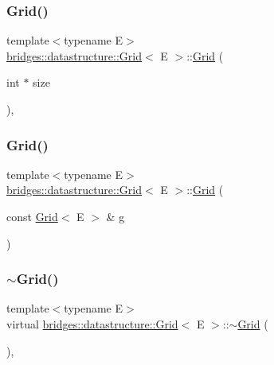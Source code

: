 \subsubsection{\texorpdfstring{Grid()}{Grid()}\hspace{0.1cm}{\footnotesize\ttfamily [3/4]}}
{\footnotesize\ttfamily template$<$typename E$>$ \\
\mbox{\hyperlink{classbridges_1_1datastructure_1_1_grid}{bridges\+::datastructure\+::\+Grid}}$<$ E $>$\+::\mbox{\hyperlink{classbridges_1_1datastructure_1_1_grid}{Grid}} (\begin{DoxyParamCaption}\item[{int $\ast$}]{size }\end{DoxyParamCaption})\hspace{0.3cm}{\ttfamily [inline]}, {\ttfamily [explicit]}}

\mbox{\label{classbridges_1_1datastructure_1_1_grid_afc81003993a30d1112d2dff71bfc191b}} 
\subsubsection{\texorpdfstring{Grid()}{Grid()}\hspace{0.1cm}{\footnotesize\ttfamily [4/4]}}
{\footnotesize\ttfamily template$<$typename E$>$ \\
\mbox{\hyperlink{classbridges_1_1datastructure_1_1_grid}{bridges\+::datastructure\+::\+Grid}}$<$ E $>$\+::\mbox{\hyperlink{classbridges_1_1datastructure_1_1_grid}{Grid}} (\begin{DoxyParamCaption}\item[{const \mbox{\hyperlink{classbridges_1_1datastructure_1_1_grid}{Grid}}$<$ E $>$ \&}]{g }\end{DoxyParamCaption})\hspace{0.3cm}{\ttfamily [inline]}}

\mbox{\label{classbridges_1_1datastructure_1_1_grid_aa04b4929a35fa359dbaab86e46fda204}} 
\subsubsection{\texorpdfstring{$\sim$\+Grid()}{~Grid()}}
{\footnotesize\ttfamily template$<$typename E$>$ \\
virtual \mbox{\hyperlink{classbridges_1_1datastructure_1_1_grid}{bridges\+::datastructure\+::\+Grid}}$<$ E $>$\+::$\sim$\mbox{\hyperlink{classbridges_1_1datastructure_1_1_grid}{Grid}} (\begin{DoxyParamCaption}{ }\end{DoxyParamCaption})\hspace{0.3cm}{\ttfamily [inline]}, {\ttfamily [virtual]}}



